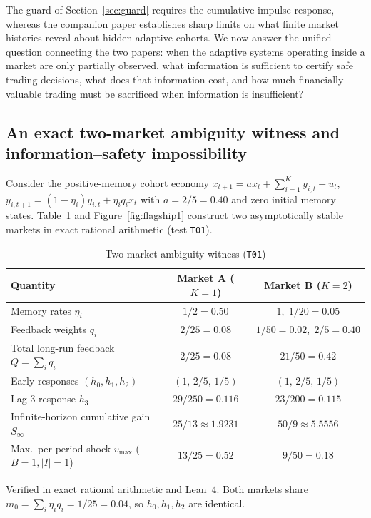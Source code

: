 The guard of Section~\ref{sec:guard} requires the cumulative impulse response, whereas the companion paper establishes sharp limits on what finite market histories reveal about hidden adaptive cohorts. We now answer the unified question connecting the two papers: when the adaptive systems operating inside a market are only partially observed, what information is sufficient to certify safe trading decisions, what does that information cost, and how much financially valuable trading must be sacrificed when information is insufficient?

\subsection{An exact two-market ambiguity witness and information--safety impossibility}
Consider the positive-memory cohort economy $x_{t+1}=ax_t+\sum_{i=1}^K y_{i,t}+u_t$, $y_{i,t+1}=(1-\eta_i)y_{i,t}+\eta_i q_i x_t$ with $a=2/5=0.40$ and zero initial memory states. Table~\ref{tab:witness} and Figure~\ref{fig:flagship1} construct two asymptotically stable markets in exact rational arithmetic (test \texttt{T01}).

\begin{table}[t]\centering\small
\begin{threeparttable}
\caption{Two-market ambiguity witness (\texttt{T01})}\label{tab:witness}
\setlength{\tabcolsep}{6pt}
\begin{tabular}{lcc}
\toprule
Quantity & Market A ($K=1$) & Market B ($K=2$)\\
\midrule
Memory rates $\eta_i$ & $1/2=0.50$ & $1,\;1/20=0.05$\\
Feedback weights $q_i$ & $2/25=0.08$ & $1/50=0.02,\;2/5=0.40$\\
Total long-run feedback $Q=\sum_i q_i$ & $2/25=0.08$ & $21/50=0.42$\\
Early responses $(h_0,h_1,h_2)$ & $(1,\,2/5,\,1/5)$ & $(1,\,2/5,\,1/5)$\\
Lag-3 response $h_3$ & $29/250=0.116$ & $23/200=0.115$\\
Infinite-horizon cumulative gain $S_\infty$ & $25/13\approx 1.9231$ & $50/9\approx 5.5556$\\
Max.\ per-period shock $v_{\max}$ ($B=1,|I|=1$) & $13/25=0.52$ & $9/50=0.18$\\
\bottomrule
\end{tabular}
\begin{tablenotes}\footnotesize\item Verified in exact rational arithmetic and Lean~4. Both markets share $m_0=\sum_i\eta_i q_i=1/25=0.04$, so $h_0,h_1,h_2$ are identical.\end{tablenotes}
\end{threeparttable}
\end{table}

